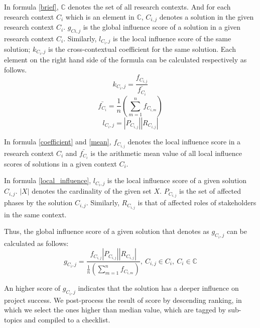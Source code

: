 In formula \ref{brief}, $\mathbb{C}$ denotes the set of all research contexts. And for each research context $C_{i}$ which is an element in $\mathbb{C}$, $C_{i,j}$ denotes a solution in the given research context $C_{i}$. $g_{Ci,j}$ is the global influence score of a solution in a given research context $C_{i}$. Similarly, $l_{C_{i},j}$ is the local influence score of the same solution; $\mathit{k_{C_{i},j}}$ is the cross-contextual coefficient for the same solution. Each element on the right hand side of the formula can be calculated respectively as follows.
\begin{equation}
\mathit{k_{C_{i},j}} = \frac{f_{C_{i,j}}}{\bar{f_{C_i}}}
\label{coefficient}
\end{equation}
\begin{equation}
\bar{f_{C_i}} = \frac{1}{n}\left (\sum_{m=1}^n{f_{C_{i,m}}}\right)
\label{mean}
\end{equation}
\begin{equation}
l_{C_{i},j} = |P_{C_{i,j}}||R_{C_{i,j}}|
\label{local_influence}
\end{equation}

In formula \ref{coefficient} and \ref{mean}, $f_{C_{i,j}}$ denotes the local influence score in a research context $C_{i}$ and $\bar{f_{C_i}}$ is the arithmetic mean value of all local influence scores of solutions in a given context $C_{i}$.

In formula \ref{local_influence}, $l_{C_{i},j}$ is the local influence score of a given solution $C_{i,j}$. $|X|$ denotes the cardinality of the given set $X$. $P_{C_{i,j}}$ is the set of affected phases by the solution $C_{i,j}$. Similarly, $R_{C_{i,j}}$ is that of affected roles of stakeholders in the same context.

Thus, the global influence score of a given solution that denotes as $g_{C_{i},j}$ can be calculated as follows:
\begin{equation}
g_{C_{i},j} =
\frac
{f_{C_{i,j}} |P_{C_{i,j}}| |R_{C_{i,j}}|} 
{\frac{1}{n}\left (\sum_{m=1}^n{f_{C_{i,m}}}\right)}
,\ 
C_{i,j} \in C_{i},\ C_{i} \in \mathbb{C}
\label{final}
\end{equation}

An higher score of $g_{C_{i},j}$ indicates that the solution has a deeper influence on project success. We post-process the result of score by descending ranking, in which we select the ones higher than median value, which are tagged by sub-topics and compiled to a checklist.
